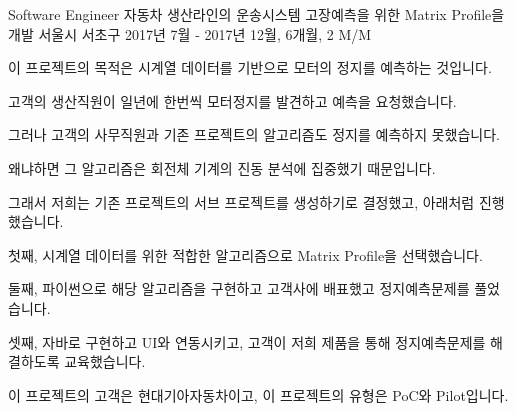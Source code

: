 \begin{cventries}
  \cventry
    {Software Engineer} %
    {자동차 생산라인의 운송시스템 고장예측을 위한 Matrix Profile을 개발} %
    {서울시 서초구} %
    {2017년 7월 - 2017년 12월, 6개월, 2 M/M} %
    {
      \begin{cvitems} %
        \item {이 프로젝트의 목적은 시계열 데이터를 기반으로 모터의 정지를 예측하는 것입니다.}
        \item {고객의 생산직원이 일년에 한번씩 모터정지를 발견하고 예측을 요청했습니다.}
        \item {그러나 고객의 사무직원과 기존 프로젝트의 알고리즘도 정지를 예측하지 못했습니다.}
        \item {왜냐하면 그 알고리즘은 회전체 기계의 진동 분석에 집중했기 때문입니다.}
        \item {그래서 저희는 기존 프로젝트의 서브 프로젝트를 생성하기로 결정했고, 아래처럼 진행했습니다.}
        \item {첫째, 시계열 데이터를 위한 적합한 알고리즘으로 Matrix Profile을 선택했습니다.}
        \item {둘째, 파이썬으로 해당 알고리즘을 구현하고 고객사에 배표했고 정지예측문제를 풀었습니다.}
        \item {셋째, 자바로 구현하고 UI와 연동시키고, 고객이 저희 제품을 통해 정지예측문제를 해결하도록 교육했습니다.}
        \item {이 프로젝트의 고객은 현대기아자동차이고, 이 프로젝트의 유형은 PoC와 Pilot입니다.}
      \end{cvitems}
    }


\end{cventries}
